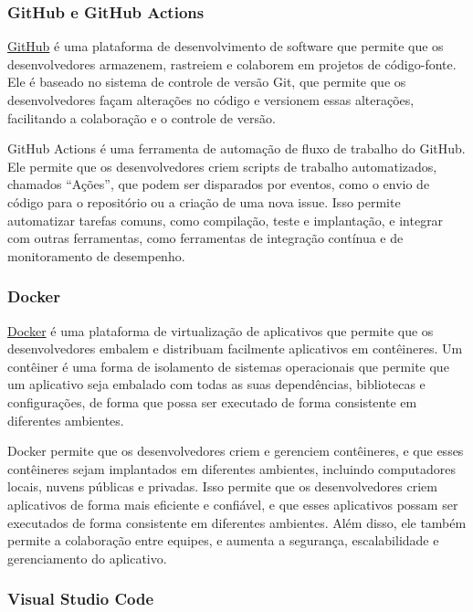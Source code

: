 \subsubsection{GitHub e GitHub Actions}

\href{https://github.com/}{GitHub} é uma plataforma de desenvolvimento de software que permite que os desenvolvedores armazenem, rastreiem e colaborem em projetos de código-fonte. Ele é baseado no sistema de controle de versão Git, que permite que os desenvolvedores façam alterações no código e versionem essas alterações, facilitando a colaboração e o controle de versão.

GitHub Actions é uma ferramenta de automação de fluxo de trabalho do GitHub. Ele permite que os desenvolvedores criem scripts de trabalho automatizados, chamados ``Ações'', que podem ser disparados por eventos, como o envio de código para o repositório ou a criação de uma nova issue. Isso permite automatizar tarefas comuns, como compilação, teste e implantação, e integrar com outras ferramentas, como ferramentas de integração contínua e de monitoramento de desempenho.

\subsubsection{Docker}

\href{https://www.docker.com/}{Docker} é uma plataforma de virtualização de aplicativos que permite que os desenvolvedores embalem e distribuam facilmente aplicativos em contêineres. Um contêiner é uma forma de isolamento de sistemas operacionais que permite que um aplicativo seja embalado com todas as suas dependências, bibliotecas e configurações, de forma que possa ser executado de forma consistente em diferentes ambientes.

Docker permite que os desenvolvedores criem e gerenciem contêineres, e que esses contêineres sejam implantados em diferentes ambientes, incluindo computadores locais, nuvens públicas e privadas. Isso permite que os desenvolvedores criem aplicativos de forma mais eficiente e confiável, e que esses aplicativos possam ser executados de forma consistente em diferentes ambientes. Além disso, ele também permite a colaboração entre equipes, e aumenta a segurança, escalabilidade e gerenciamento do aplicativo.

\subsubsection{Visual Studio Code}

